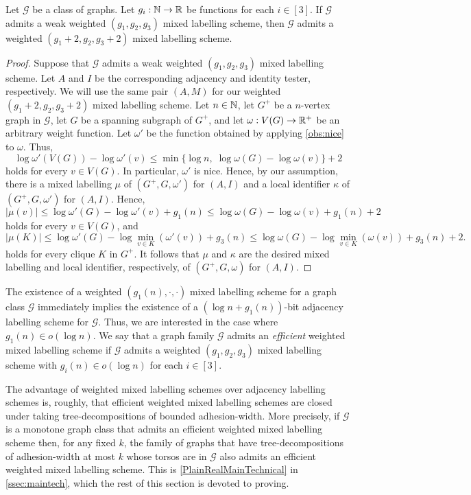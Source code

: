 \documentclass{patmorin}
\renewcommand{\le}{\leqslant}
\renewcommand{\leq}{\leqslant}
\newcommand{\pat}[1]{\noindent\textcolor{Magenta}{PaMo: #1}}
\newcommand{\piotr}[1]{\noindent\textcolor{red}{PiMi: #1}}
\newcommand{\defin}[1]{\emph{\textcolor{brightmaroon}{#1}}}
\newcommand{\calG}{\mathcal{G}}
\begin{document}
\begin{lem}
    \label{lem:nice_weights}
    Let $\calG$ be a class of graphs.
    Let $g_i:\mathbb{N}\to\mathbb{R}$ be functions for each $i\in[3]$.
    If $\calG$ admits a weak weighted $(g_1,g_2,g_3)$ mixed labelling scheme, then $\calG$ admits a weighted $(g_1+2,g_2,g_3+2)$ mixed labelling scheme. %
\end{lem}
\begin{proof}
    Suppose that $\calG$ admits a weak weighted $(g_1,g_2,g_3)$ mixed labelling scheme.
    Let $A$ and $I$ be the corresponding adjacency and identity tester, respectively.
    We will use the same pair $(A, M)$ for our weighted $(g_1+2,g_2,g_3+2)$ mixed labelling scheme.
    Let $n\in \mathbb{N}$, let $G^+$ be a  $n$-vertex graph in $\calG$, let $G$ be a spanning subgraph of $G^+$, and let $\omega:V(G)\to \mathbb{R}^+$ be an arbitrary weight function.
    Let $\omega'$ be the function obtained by applying \cref{obs:nice} to $\omega$.
    Thus,
    \[
      \log\omega'(V(G))-\log\omega'(v)\le\min\{\log n,\;\log\omega(G)-\log\omega(v)\}+2
    \]
    holds for every $v\in V(G)$.
    In particular, $\omega'$ is nice.
    Hence, by our assumption, there is a mixed labelling $\mu$ of $(G^+,G,\omega')$ for $(A,I)$ and a local identifier $\kappa$ of $(G^+,G,\omega')$ for $(A,I)$.
    Hence,
    \[
    |\mu(v)| \leq \log \omega'(G) - \log\omega'(v) + g_1(n) \leq \log \omega(G) - \log\omega(v) + g_1(n) + 2
    \]
    holds for every $v\in V(G)$, and
    \[
    |\mu(K)|\le \log \omega'(G) - \log\min_{v\in K}(\omega'(v)) + g_3(n)
    \leq \log \omega(G) - \log\min_{v\in K}(\omega(v)) + g_3(n) + 2.
    \]
    holds for every clique $K$ in $G^+$.
    It follows that $\mu$ and  $\kappa$ are the desired  mixed labelling and local identifier, respectively,  of $(G^+,G,\omega)$ for $(A,I)$.
\end{proof}


The existence of a weighted $(g_1(n),\cdot,\cdot)$ mixed labelling scheme for a graph class $\calG$ immediately implies the existence of a $(\log n+g_1(n))$-bit adjacency labelling scheme for $\calG$. Thus, we are interested in the case where $g_1(n)\in o(\log n)$. We say that a graph family $\calG$ admits an \defin{efficient} weighted mixed labelling scheme if $\calG$ admits a weighted $(g_1,g_2,g_3)$ mixed labelling scheme with $g_i(n)\in o(\log n)$ for each $i\in [3]$.

The advantage of weighted mixed labelling schemes over adjacency labelling schemes is, roughly, that efficient weighted mixed labelling schemes are closed under taking tree-decompositions of bounded adhesion-width. More precisely, if $\calG$ is a monotone graph class that admits an efficient weighted mixed labelling scheme then, for any fixed $k$, the family of graphs that have tree-decompositions of adhesion-width at most $k$ whose torsos are in $\calG$ also admits an efficient weighted mixed labelling scheme. This is \cref{PlainRealMainTechnical} in \cref{ssec:maintech}, which the rest of this section is devoted to proving.
\end{document}

